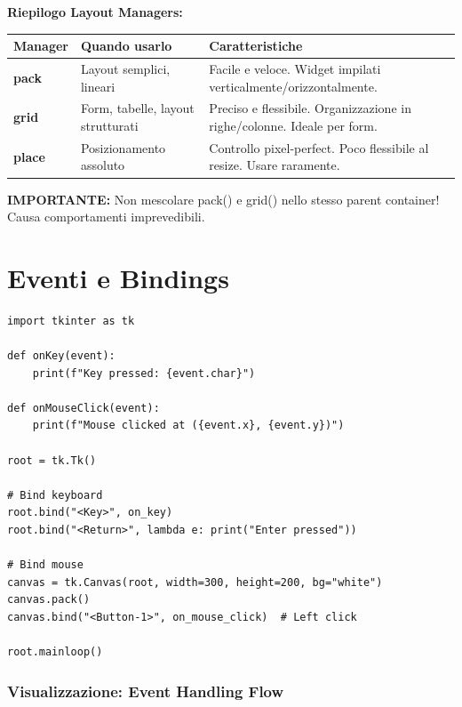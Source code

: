 \textbf{Riepilogo Layout Managers:}

\begin{center}
\begin{tabular}{|l|p{4cm}|p{5cm}|}
\hline
\textbf{Manager} & \textbf{Quando usarlo} & \textbf{Caratteristiche} \\
\hline
\textbf{pack} & Layout semplici, lineari & Facile e veloce. Widget impilati verticalmente/orizzontalmente. \\
\hline
\textbf{grid} & Form, tabelle, layout strutturati & Preciso e flessibile. Organizzazione in righe/colonne. Ideale per form. \\
\hline
\textbf{place} & Posizionamento assoluto & Controllo pixel-perfect. Poco flessibile al resize. Usare raramente. \\
\hline
\end{tabular}
\end{center}

\textbf{IMPORTANTE:} Non mescolare pack() e grid() nello stesso parent container! Causa comportamenti imprevedibili.

\section{Eventi e Bindings}

\begin{lstlisting}
import tkinter as tk

def onKey(event):
    print(f"Key pressed: {event.char}")

def onMouseClick(event):
    print(f"Mouse clicked at ({event.x}, {event.y})")

root = tk.Tk()

# Bind keyboard
root.bind("<Key>", on_key)
root.bind("<Return>", lambda e: print("Enter pressed"))

# Bind mouse
canvas = tk.Canvas(root, width=300, height=200, bg="white")
canvas.pack()
canvas.bind("<Button-1>", on_mouse_click)  # Left click

root.mainloop()
\end{lstlisting}

\subsubsection{Visualizzazione: Event Handling Flow}

